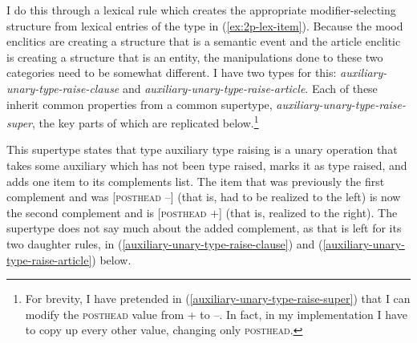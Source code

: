 I do this through a lexical rule which creates the appropriate modifier-selecting structure from lexical entries of the type in (\ref{ex:2p-lex-item}). Because the mood enclitics are creating a structure that is a semantic event and the article enclitic is creating a structure that is an entity, the manipulations done to these two categories need to be somewhat different. I have two types for this: {\textit{auxiliary-unary-type-raise-clause}} and {\textit{auxiliary-unary-type-raise-article}}. Each of these inherit common properties from a common supertype, {\textit{auxiliary-unary-type-raise-super}}, the key parts of which are replicated below.\footnote{For brevity, I have pretended in (\ref{auxiliary-unary-type-raise-super}) that I can modify the \textsc{posthead} value from + to --. In fact, in my implementation I have to copy up every other value, changing only \textsc{posthead}.}

\begin{singlespacing}
\ex \label{auxiliary-unary-type-raise-super}
\xe
\end{singlespacing}

This supertype states that type auxiliary type raising is a unary operation that takes some auxiliary which has not been type raised, marks it as type raised, and adds one item to its complements list. The item that was previously the first complement and was [\textsc{posthead} --] (that is, had to be realized to the left) is now the second complement and is [\textsc{posthead} +] (that is, realized to the right). The supertype does not say much about the added complement, as that is left for its two daughter rules, in (\ref{auxiliary-unary-type-raise-clause}) and (\ref{auxiliary-unary-type-raise-article}) below.

